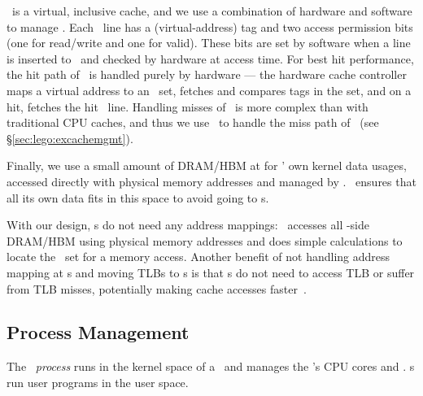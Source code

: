 \excache\ is a virtual, inclusive cache,
and we use a combination of hardware and software to manage \excache.
Each \excache\ line has a (virtual-address) tag and two access permission bits (one for read/write and one for valid).
These bits are set by software when a line is inserted to \excache\ and checked by hardware at access time.
For best hit performance, the hit path of \excache\ is handled purely by hardware
--- the hardware cache controller maps a virtual address to an \excache\ set, 
fetches and compares tags in the set, and on a hit, fetches the hit \excache\ line.
Handling misses of \excache\ is more complex than with traditional CPU caches, 
and thus we use \lego\ to handle the miss path of \excache\ (see \S\ref{sec:lego:excachemgmt}).

Finally, we use a small amount of DRAM/HBM at \pcomponent{} for \lego' own kernel data usages,
accessed directly with physical memory addresses and managed by \lego. 
\lego\ ensures that all its own data fits in this space to avoid going to \mcomponent{}s.

With our design, \pcomponent{}s do not need any address mappings:
\lego\ accesses all \pcomponent{}-side DRAM/HBM using physical memory addresses
and does simple calculations to locate the \excache\ set for a memory access.
Another benefit of not handling address mapping at \pcomponent{}s and moving TLBs to \mcomponent{}s 
is that \pcomponent{}s do not need to access TLB or suffer from TLB misses,
potentially making \pcomponent{} cache accesses faster~\cite{Kaxiras-ISCA13}.

\subsection{Process Management}
The \lego\ {\em process \microos{}} runs in the kernel space of a \pcomponent\
and manages the \pcomponent's CPU cores and \excache. 
\pcomponent{}s run user programs in the user space.

